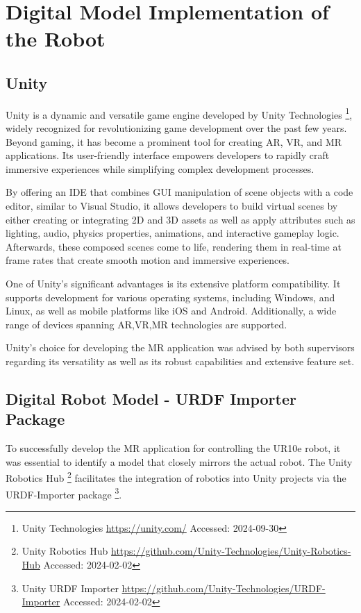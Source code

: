 \section{Digital Model Implementation of the Robot}
\label{section:digital-model}

\subsection{Unity}



Unity is a dynamic and versatile game engine developed by Unity Technologies \footnote{Unity Technologies \url{https://unity.com/} Accessed: 2024-09-30}, widely recognized for revolutionizing game development over the past few years. Beyond gaming, it has become a prominent tool for creating \ac{AR}, \ac {VR}, and \ac{MR} applications. Its user-friendly interface empowers developers to rapidly craft immersive experiences while simplifying complex development processes.

By offering an \ac{IDE} that combines \ac{GUI} manipulation of scene objects with a code editor, similar to Visual Studio, it allows developers to build virtual scenes by either creating or integrating 2D and 3D assets as well as apply attributes such as lighting, audio, physics properties, animations, and interactive gameplay logic. Afterwards, these composed scenes come to life, rendering them in real-time at frame rates that create smooth motion and immersive experiences.

One of Unity's significant advantages is its extensive platform compatibility. It supports development for various operating systems, including Windows, and Linux, as well as mobile platforms like iOS and Android. Additionally, a wide range of devices spanning \ac{AR},\ac{VR},\ac{MR} technologies are supported.

Unity's choice for developing the \ac{MR} application was advised by both supervisors regarding its versatility as well as its robust capabilities and extensive feature set.

\subsection{Digital Robot Model - URDF Importer Package}

    To successfully develop the \ac{MR} application for controlling the UR10e robot, it was essential to identify a model that closely mirrors 
    the actual robot. The Unity Robotics Hub \footnote{Unity Robotics Hub \url{https://github.com/Unity-Technologies/Unity-Robotics-Hub} 
    Accessed: 2024-02-02} facilitates the integration of robotics into Unity projects via the URDF-Importer package 
    \footnote{Unity URDF Importer \url{https://github.com/Unity-Technologies/URDF-Importer} Accessed: 2024-02-02}. 
    
